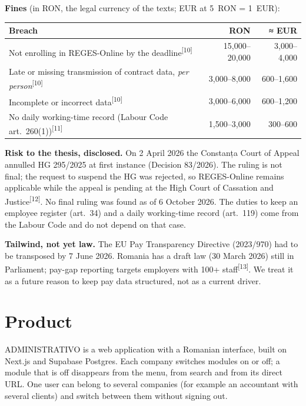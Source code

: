 \documentclass[10pt,a4paper]{article}
\newcommand{\src}[1]{\textsuperscript{\textcolor{brandSlate}{[#1]}}}
\begin{document}
\textbf{Fines} (in RON, the legal currency of the texts; EUR at 5~RON = 1~EUR):

\begin{table}[H]
\centering\small
\begin{tabularx}{\linewidth}{@{}Lrr@{}}
\toprule
\textbf{Breach} & \textbf{RON} & \textbf{≈ EUR} \\
\midrule
Not enrolling in REGES-Online by the deadline\src{10} & 15,000--20,000 & 3,000--4,000 \\
Late or missing transmission of contract data, \emph{per person}\src{10} & 3,000--8,000 & 600--1,600 \\
Incomplete or incorrect data\src{10} & 3,000--6,000 & 600--1,200 \\
No daily working-time record (Labour Code art.~260(1))\src{11} & 1,500--3,000 & 300--600 \\
\bottomrule
\end{tabularx}
\end{table}

\textbf{Risk to the thesis, disclosed.} On 2 April 2026 the Constanța Court of Appeal annulled HG
295/2025 at first instance (Decision 83/2026). The ruling is not final; the request to suspend the
HG was rejected, so REGES-Online remains applicable while the appeal is pending at the High Court
of Cassation and Justice\src{12}. No final ruling was found as of 6 October 2026. The duties to
keep an employee register (art.~34) and a daily working-time record (art.~119) come from the
Labour Code and do not depend on that case.

\textbf{Tailwind, not yet law.} The EU Pay Transparency Directive (2023/970) had to be transposed
by 7 June 2026. Romania has a draft law (30 March 2026) still in Parliament; pay-gap reporting
targets employers with 100+ staff\src{13}. We treat it as a future reason to keep pay data
structured, not as a current driver.

\section{Product}\label{sec:produs}\nobreak

ADMINISTRATIVO is a web application with a Romanian interface, built on Next.js and Supabase
Postgres. Each company switches modules on or off; a module that is off disappears from the menu,
from search and from its direct URL. One user can belong to several companies (for example an
accountant with several clients) and switch between them without signing out.
\end{document}
